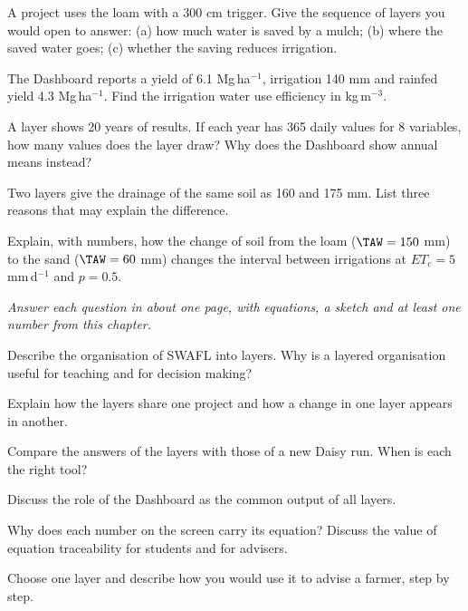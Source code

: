 \begin{exlist}
\item A project uses the loam with a 300 cm trigger. Give the sequence of layers you would open to answer: (a) how much water is saved by a mulch; (b) where the saved water goes; (c) whether the saving reduces irrigation.
\item The Dashboard reports a yield of 6.1 Mg\,ha$^{-1}$, irrigation 140 mm and rainfed yield 4.3 Mg\,ha$^{-1}$. Find the irrigation water use efficiency in kg\,m$^{-3}$.
\item A layer shows 20 years of results. If each year has 365 daily values for 8 variables, how many values does the layer draw? Why does the Dashboard show annual means instead?
\item Two layers give the drainage of the same soil as 160 and 175 mm. List three reasons that may explain the difference.
\item Explain, with numbers, how the change of soil from the loam ($\TAW=150$ mm) to the sand ($\TAW=60$ mm) changes the interval between irrigations at $ET_c=5$ mm\,d$^{-1}$ and $p=0.5$.
\end{exlist}
{\small\itshape Answer each question in about one page, with equations, a sketch and at least one number from this chapter.}\par\vspace{3pt}
\begin{exlist}
\item Describe the organisation of SWAFL into layers. Why is a layered organisation useful for teaching and for decision making?
\item Explain how the layers share one project and how a change in one layer appears in another.
\item Compare the answers of the layers with those of a new Daisy run. When is each the right tool?
\item Discuss the role of the Dashboard as the common output of all layers.
\item Why does each number on the screen carry its equation? Discuss the value of equation traceability for students and for advisers.
\item Choose one layer and describe how you would use it to advise a farmer, step by step.
\end{exlist}
